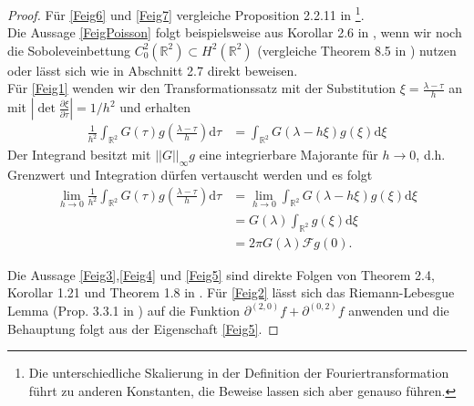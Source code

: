 \documentclass[12pt,a4paper]{scrartcl}
\newcommand{\dd}{\mathrm{d}}
\numberwithin{equation}{section}
\newcommand{\R}{\mathbb{R}} %
\newcommand{\F}{\mathcal{F}} %
\begin{document}
\begin{proof}
Für \eqref{Feig6} und \eqref{Feig7} vergleiche Proposition 2.2.11 in \cite{Grafakos}\footnote{Die unterschiedliche Skalierung in der Definition der Fouriertransformation führt zu anderen Konstanten, die Beweise lassen sich aber genauso führen.}.  \\
Die Aussage \eqref{FeigPoisson} folgt beispielsweise aus Korollar 2.6 in \cite{Stein}, wenn wir noch die Soboleveinbettung  $C_0^2 (\R^2) \subset H^2(\R^2)$ (vergleiche Theorem 8.5 in \cite{kress}) nutzen oder lässt sich wie in \cite{Dym} Abschnitt 2.7 direkt beweisen. \\
Für \eqref{Feig1} wenden wir den Transformationssatz mit der Substitution $\xi = \frac{\lambda-\tau}{h}$ an mit $|\det \frac{\partial \xi}{\partial \tau}| = 1/h^2 $ und erhalten
\begin{align*}
\frac{1}{h^2} \int_{\R^2} G(\tau) g \left(\frac{\lambda - \tau}{h} \right)\dd \tau &= \int_{\R^2} G(\lambda - h \xi) g (\xi)\dd \xi 
\end{align*}
Der Integrand besitzt mit $||G||_\infty g$ eine integrierbare Majorante für $h \to 0$, d.h. Grenzwert und Integration dürfen vertauscht werden und  es folgt
\begin{align*}
\lim_{h \to 0}\frac{1}{h^2} \int_{\R^2} G(\tau) g \left(\frac{\lambda - \tau}{h} \right)\dd \tau &= \lim_{h \to 0} \int_{\R^2} G(\lambda - h \xi) g (\xi)\dd \xi \\
& = G(\lambda) \int_{\R^2} g(\xi) \dd \xi \\
&= 2 \pi G(\lambda) \F g(0) .
\end{align*}


Die Aussage \eqref{Feig3},\eqref{Feig4} und \eqref{Feig5} sind direkte Folgen von Theorem 2.4, Korollar 1.21 und Theorem 1.8 in \cite{Stein}. 
Für \eqref{Feig2} lässt sich das Riemann-Lebesgue Lemma (Prop. 3.3.1 in \cite{Grafakos}) auf die Funktion $\partial^{(2,0)} f + \partial^{(0,2)}f$ anwenden und die Behauptung folgt aus der Eigenschaft \eqref{Feig5}.
\end{proof}
\newpage
  \newpage
\end{document}
